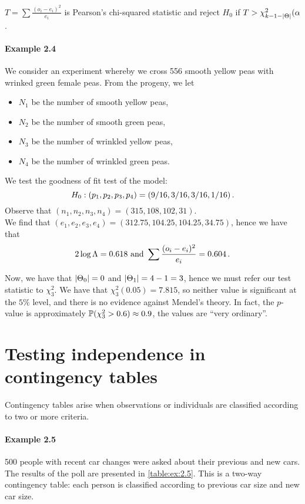 $T = \sum \frac{(o_i - e_i)^2}{e_i}$ is Pearson's chi-squared statistic and reject $H_0$ if $T > \chi^2_{k-1-\lvert\Theta\rvert}(\alpha$.

\paragraph{Example 2.4}

We consider an experiment whereby we cross 556 smooth yellow peas with wrinked green female peas. From the progeny, we let
\begin{itemize}
\item $N_1$ be the number of smooth yellow peas,
\item $N_2$ be the number of smooth green peas,
\item $N_3$ be the number of wrinkled yellow peas,
\item $N_4$ be the number of wrinkled green peas.
\end{itemize}
We test the goodness of fit test of the model:
\[
H_0 : (p_1, p_2, p_3, p_4) = (9/16, 3/16, 3/16, 1/16) \, {.}
\]
Observe that $(n_1, n_2, n_3, n_4) = (315, 108, 102, 31)$. \\
We find that $(e_1, e_2, e_3, e_4) = (312.75, 104.25, 104.25, 34.75)$, hence we have that
\[
2 \log \Lambda = 0.618 \text{ and } \sum \frac{(o_i - e_i)^2}{e_i} = 0.604 \, {.}
\]

Now, we have that $\lvert\Theta_0\rvert = 0$ and $\lvert\Theta_1\rvert = 4 - 1 = 3$, hence we must refer our test statistic to $\chi^2_3$.
We have that $\chi^2_3 (0.05) = 7.815$, so neither value is significant at the $5\%$ level, and there is no evidence against Mendel's theory.
In fact, the $p$-value is approximately $\mathbb{P}(\chi^2_3 > 0.6) \approx 0.9$, the values are ``very ordinary''.


\section{Testing independence in contingency tables\label{sec:2.6}}
Contingency tables arise when observations or individuals are classified according to two or more criteria.

\paragraph{Example 2.5\label{ex:2.5}}
500 people with recent car changes were asked about their previous and new cars.
The results of the poll are presented in \vref{table:ex:2.5}.
This is a two-way contingency table: each person is classified according to previous car size and new car size.

